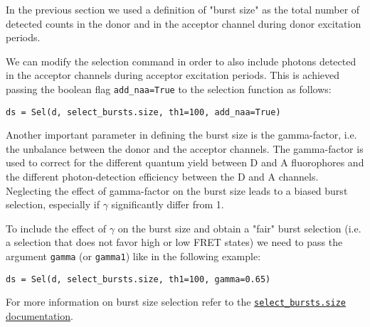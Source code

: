 In the previous section we used a definition of "burst size" as the total number of detected counts in the donor and in the acceptor channel during donor excitation periods. 

We can modify the selection command in order to also include photons detected in the acceptor channels during acceptor excitation periods. This is achieved passing the boolean flag \verb|add_naa=True| to the selection function as follows:

\begin{verbatim}
ds = Sel(d, select_bursts.size, th1=100, add_naa=True)
\end{verbatim}

Another important parameter in defining the burst size is the gamma-factor, i.e. the unbalance between the donor and the acceptor channels. The gamma-factor is used to correct for the different quantum yield between D and A fluorophores and the different photon-detection efficiency between the D and A channels. Neglecting the effect of gamma-factor on the burst size leads to a biased burst selection, especially if $\gamma$ significantly differ from 1. 

To include the effect of $\gamma$ on the burst size and obtain a "fair" burst selection (i.e. a selection that does not favor high or low FRET states) we
need to pass the argument \verb|gamma| (or \verb|gamma1|) like in the following example:

\begin{verbatim}
ds = Sel(d, select_bursts.size, th1=100, gamma=0.65)
\end{verbatim}

For more information on burst size selection refer to the \href{http://fretbursts.readthedocs.org/en/latest/burst_selection.html#fretbursts.select_bursts.size}{\verb|select_bursts.size| documentation}.

